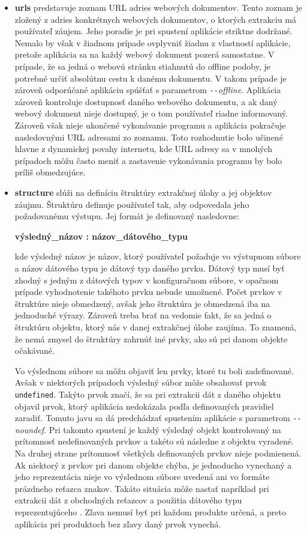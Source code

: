 \begin{itemize}
  \item \textbf{urls} predstavuje zoznam URL adries webových dokumentov. Tento zoznam je zložený z adries konkrétnych webových dokumentov, o ktorých extrakciu má používateľ záujem. Jeho poradie je pri spustení aplikácie striktne dodržané. Nemalo by však v žiadnom prípade ovplyvniť žiadnu z vlastností aplikácie, pretože aplikácia sa na každý webový dokument pozerá samostatne. V prípade, že sa jedná o webovú stránku stiahnutú do offline podoby, je potrebné určiť absolútnu cestu k danému dokumentu. V takom prípade je zároveň odporúčané aplikáciu spúšťať s parametrom \textit{\texttt{-{}-}offline}. Aplikácia zároveň kontroluje dostupnosť daného webového dokumentu, a ak daný webový dokument nieje dostupný, je o tom používateľ riadne informovaný. Zároveň však nieje ukončené vykonávanie programu a aplikácia pokračuje nasledovnými URL adresami zo zoznamu. Toto rozhodnutie bolo učinené hlavne z dynamickej povahy internetu, kde URL adresy sa v mnohých prípadoch môžu často meniť a zastavenie vykonávania programu by bolo príliš obmedzujúce. 
  
  \item \textbf{structure} slúži na definíciu štruktúry extrakčnej úlohy a jej objektov záujmu. Štruktúru definuje používateľ tak, aby odpovedala jeho požadovanému výstupu. Jej formát je definovaný nasledovne:
  
  \textbf{výsledný\_názov : názov\_dátového\_typu}
  
  kde výsledný názov je názov, ktorý používateľ požaduje vo výstupnom súbore a názov dátového typu je  dátový typ daného prvku. Dátový typ musí byť zhodný s jedným z dátových typov v konfiguračnom súbore, v opačnom prípade vyhodnotenie takéhoto prvku nebude umožnené. Počet prvkov v štruktúre nieje obmedzený, avšak jeho štruktúra je obmedzená iba na jednoduché výrazy. Zároveň treba brať na vedomie fakt, že sa jedná o štruktúru objektu, ktorý nás v danej extrakčnej úlohe zaujíma. To znamená, že nemá zmysel do štruktúry zahrnúť iné prvky, ako sú pri danom objekte očakávané.
  
  Vo výslednom súbore sa môžu objaviť len prvky, ktoré tu boli zadefinované. Avšak v niektorých prípadoch výsledný súbor môže obsahovať prvok \texttt{undefined}. Takýto prvok značí, že sa pri extrakcii dát z daného objektu objavil prvok, ktorý aplikácia nedokázala podľa definovaných pravidiel zaradiť. Tomuto javu sa dá predchádzať spustením aplikácie s parametrom \textit{\texttt{-{}-}noundef}. Pri takomto spustení je každý výsledný objekt kontrolovaný na prítomnosť nedefinovaných prvkov a takéto sú následne z objektu vyradené. Na druhej strane prítomnosť všetkých definovaných prvkov nieje podmienená. Ak niektorý z prvkov pri danom objekte chýba, je jednoducho vynechaný a jeho reprezentácia nieje vo výslednom súbore uvedená ani vo formáte prázdneho reťazca znakov. Takáto situácia môže nastať napríklad pri extrakcii dát z obchodných reťazcov a použitia dátového typu reprezentujúceho . Zľava nemusí byť pri každom produkte určená, a preto aplikácia pri produktoch bez zľavy daný prvok vynechá.
  

\end{itemize}
